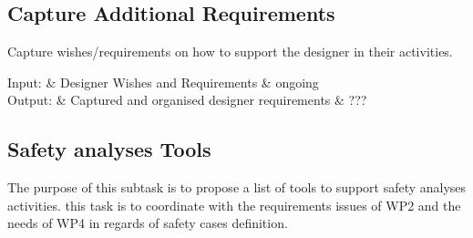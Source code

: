 \documentclass{template/openetcs_article}
\begin{document}
%
% 
%

\subsection{Capture Additional Requirements}

Capture wishes/requirements on how to support the designer in their activities.

\begin{inoutput}
Input: & Designer Wishes and Requirements & ongoing \\
\hline
Output: & Captured and organised designer requirements & ??? \\
\end{inoutput}


\subsection{Safety analyses Tools}


The purpose of this subtask is to propose a list of tools to  support  safety  analyses activities. this task  is to  coordinate with  the requirements issues of WP2 and the needs of WP4 in regards of safety cases definition.
\end{document}
